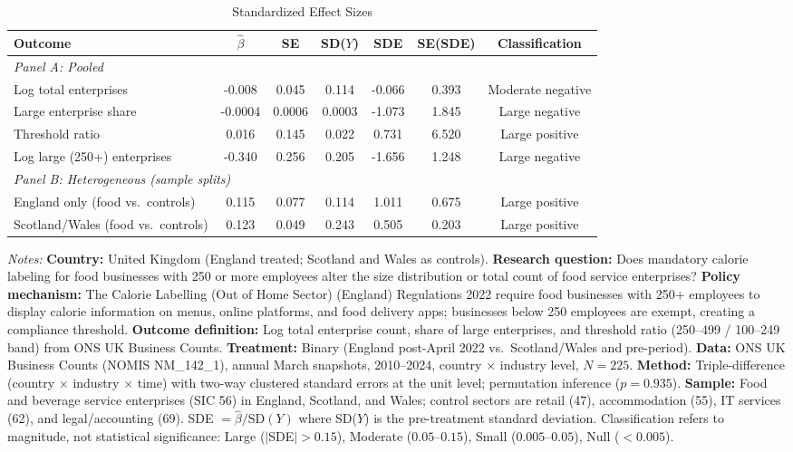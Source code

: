 \begin{table}[!t]
\centering
\caption{Standardized Effect Sizes}
\label{tab:sde}
\begin{adjustbox}{max width=\textwidth}
\begin{tabular}{lcccccc}
\hline\hline
Outcome & $\hat{\beta}$ & SE & SD($Y$) & SDE & SE(SDE) & Classification \\
\hline
\multicolumn{7}{l}{\textit{Panel A: Pooled}} \\[3pt]
Log total enterprises & -0.008 & 0.045 & 0.114 & -0.066 & 0.393 & Moderate negative \\
Large enterprise share & -0.0004 & 0.0006 & 0.0003 & -1.073 & 1.845 & Large negative \\
Threshold ratio & 0.016 & 0.145 & 0.022 & 0.731 & 6.520 & Large positive \\
Log large (250+) enterprises & -0.340 & 0.256 & 0.205 & -1.656 & 1.248 & Large negative \\[6pt]
\multicolumn{7}{l}{\textit{Panel B: Heterogeneous (sample splits)}} \\[3pt]
England only (food vs.\ controls) & 0.115 & 0.077 & 0.114 & 1.011 & 0.675 & Large positive \\
Scotland/Wales (food vs.\ controls) & 0.123 & 0.049 & 0.243 & 0.505 & 0.203 & Large positive \\
\hline\hline
\end{tabular}
\end{adjustbox}
\begin{tablenotes}[flushleft]
\small
\item \textit{Notes:} \textbf{Country:} United Kingdom (England treated; Scotland and Wales as controls). \textbf{Research question:} Does mandatory calorie labeling for food businesses with 250 or more employees alter the size distribution or total count of food service enterprises? \textbf{Policy mechanism:} The Calorie Labelling (Out of Home Sector) (England) Regulations 2022 require food businesses with 250+ employees to display calorie information on menus, online platforms, and food delivery apps; businesses below 250 employees are exempt, creating a compliance threshold. \textbf{Outcome definition:} Log total enterprise count, share of large enterprises, and threshold ratio (250--499 / 100--249 band) from ONS UK Business Counts. \textbf{Treatment:} Binary (England post-April 2022 vs.\ Scotland/Wales and pre-period). \textbf{Data:} ONS UK Business Counts (NOMIS NM\_142\_1), annual March snapshots, 2010--2024, country $\times$ industry level, $N = 225$. \textbf{Method:} Triple-difference (country $\times$ industry $\times$ time) with two-way clustered standard errors at the unit level; permutation inference ($p = 0.935$). \textbf{Sample:} Food and beverage service enterprises (SIC 56) in England, Scotland, and Wales; control sectors are retail (47), accommodation (55), IT services (62), and legal/accounting (69). SDE $= \hat{\beta} / \text{SD}(Y)$ where SD($Y$) is the pre-treatment standard deviation. Classification refers to magnitude, not statistical significance: Large ($|$SDE$| > 0.15$), Moderate ($0.05$--$0.15$), Small ($0.005$--$0.05$), Null ($< 0.005$).
\end{tablenotes}
\end{table}
